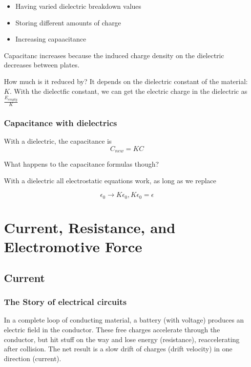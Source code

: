 \documentclass{article}
\begin{document}
\begin{itemize}
	\item Having varied dielectric breakdown values
	\item Storing different amounts of charge
	\item Increasing capaacitance

\end{itemize}

Capacitanc increases because the induced charge density on the dielectric decreases between plates.

How much is it reduced by? It depends on the dielectric constant of the material: $K$. With the dielectfic constant, we can get the electric charge in the dielectric as $\frac{E_{empty}}{K}$

\subsubsection{Capacitance with dielectrics}

With a dielectric, the capacitance is 
\begin{equation} C_{new}=KC \end{equation}

What happens to the capacitance formulas though?

With a dielectric all electrostatic equations work, as long as we replace

\begin{equation} \epsilon_0 \rightarrow K\epsilon_0, K\epsilon_0 = \epsilon \end{equation}

\section{Current, Resistance, and Electromotive Force}

\subsection{Current}

\subsubsection{The Story of electrical circuits}

In a complete loop of conducting material, a battery (with voltage) produces an electric field in the conductor. These free charges accelerate through the 
conductor, but hit stuff on the way and lose energy (resistance), reaccelerating after collision. The net result is a slow drift of charges (drift velocity)
in one direction (current).
\end{document}
